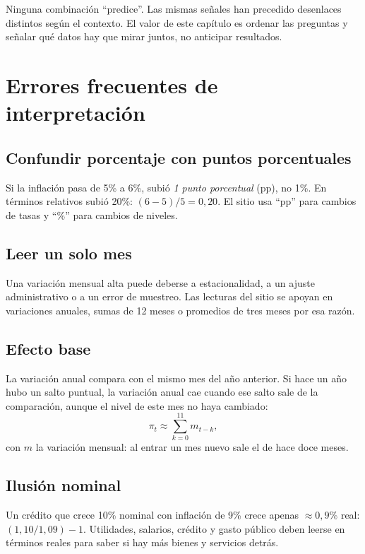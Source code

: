 \begin{alerta}
Ninguna combinación ``predice''. Las mismas señales han precedido desenlaces distintos según el contexto. El valor de
este capítulo es ordenar las preguntas y señalar qué datos hay que mirar juntos, no anticipar resultados.
\end{alerta}

\chapter{Errores frecuentes de interpretación}
\label{es:i:errores}

\section{Confundir porcentaje con puntos porcentuales}
Si la inflación pasa de 5\% a 6\%, subió \emph{1 punto porcentual} (pp), no 1\%. En términos relativos subió 20\%:
$(6-5)/5=0{,}20$. El sitio usa ``pp'' para cambios de tasas y ``\%'' para cambios de niveles.

\section{Leer un solo mes}
Una variación mensual alta puede deberse a estacionalidad, a un ajuste administrativo o a un error de muestreo. Las
lecturas del sitio se apoyan en variaciones anuales, sumas de 12 meses o promedios de tres meses por esa razón.

\section{Efecto base}
La variación anual compara con el mismo mes del año anterior. Si hace un año hubo un salto puntual, la variación anual
cae cuando ese salto sale de la comparación, aunque el nivel de este mes no haya cambiado:
\[
\pi_t \approx \sum_{k=0}^{11} m_{t-k},
\]
con $m$ la variación mensual: al entrar un mes nuevo sale el de hace doce meses.

\section{Ilusión nominal}
Un crédito que crece 10\% nominal con inflación de 9\% crece apenas $\approx 0{,}9\%$ real:
$(1{,}10/1{,}09)-1$. Utilidades, salarios, crédito y gasto público deben leerse en términos reales para saber si hay
más bienes y servicios detrás.

